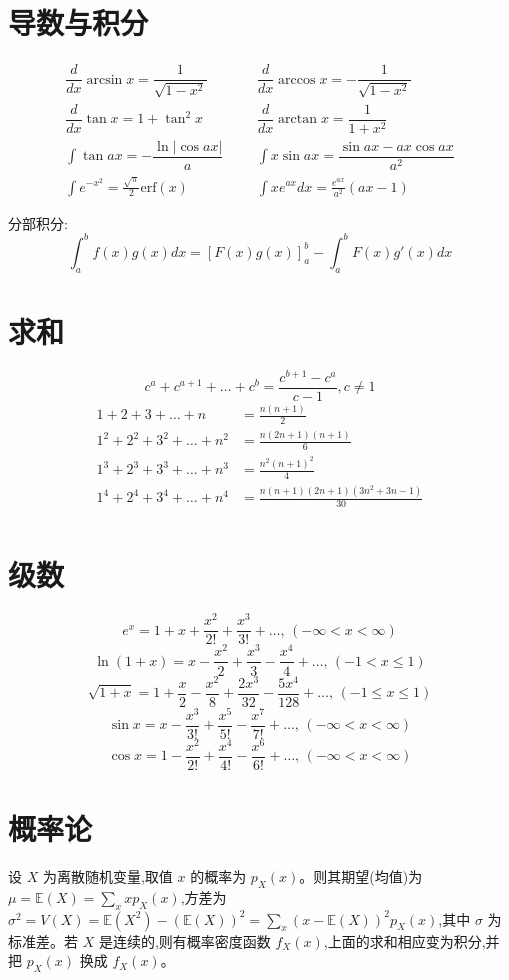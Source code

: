 \section{导数与积分}
\begin{align*}
	\dfrac{d}{dx}\arcsin x = \dfrac{1}{\sqrt{1-x^2}} &&& \dfrac{d}{dx}\arccos x = -\dfrac{1}{\sqrt{1-x^2}} \\
	\dfrac{d}{dx}\tan x = 1+\tan^2 x &&& \dfrac{d}{dx}\arctan x = \dfrac{1}{1+x^2} \\
	\int\tan ax = -\dfrac{\ln|\cos ax|}{a} &&& \int x\sin ax = \dfrac{\sin ax-ax \cos ax}{a^2} \\
	\int e^{-x^2} = \frac{\sqrt \pi}{2} \text{erf}(x) &&& \int xe^{ax}dx = \frac{e^{ax}}{a^2}(ax-1)
\end{align*}

分部积分:
\[\int_a^bf(x)g(x)dx = [F(x)g(x)]_a^b-\int_a^bF(x)g'(x)dx\]

\section{求和}
\[ c^a + c^{a+1} + \dots + c^{b} = \frac{c^{b+1} - c^a}{c-1}, c \neq 1 \]
\begin{align*}
	1 + 2 + 3 + \dots + n &= \frac{n(n+1)}{2} \\
	1^2 + 2^2 + 3^2 + \dots + n^2 &= \frac{n(2n+1)(n+1)}{6} \\
	1^3 + 2^3 + 3^3 + \dots + n^3 &= \frac{n^2(n+1)^2}{4} \\
	1^4 + 2^4 + 3^4 + \dots + n^4 &= \frac{n(n+1)(2n+1)(3n^2 + 3n - 1)}{30} \\
\end{align*}

\section{级数}
$$e^x = 1+x+\frac{x^2}{2!}+\frac{x^3}{3!}+\dots,\,(-\infty<x<\infty)$$
$$\ln(1+x) = x-\frac{x^2}{2}+\frac{x^3}{3}-\frac{x^4}{4}+\dots,\,(-1<x\leq1)$$
$$\sqrt{1+x} = 1+\frac{x}{2}-\frac{x^2}{8}+\frac{2x^3}{32}-\frac{5x^4}{128}+\dots,\,(-1\leq x\leq1)$$
$$\sin x = x-\frac{x^3}{3!}+\frac{x^5}{5!}-\frac{x^7}{7!}+\dots,\,(-\infty<x<\infty)$$
$$\cos x = 1-\frac{x^2}{2!}+\frac{x^4}{4!}-\frac{x^6}{6!}+\dots,\,(-\infty<x<\infty)$$

\section{概率论}
设 $X$ 为离散随机变量,取值 $x$ 的概率为 $p_X(x)$。则其期望(均值)为 $\mu=\mathbb{E}(X)=\sum_xxp_X(x)$,方差为 $\sigma^2=V(X)=\mathbb{E}(X^2)-(\mathbb{E}(X))^2=\sum_x(x-\mathbb{E}(X))^2p_X(x)$,其中 $\sigma$ 为标准差。若 $X$ 是连续的,则有概率密度函数 $f_X(x)$,上面的求和相应变为积分,并把 $p_X(x)$ 换成 $f_X(x)$。


